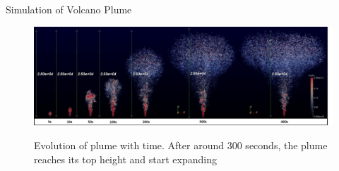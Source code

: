 \documentclass[final]{beamer}
\newlength{\onecolwid}
\newlength{\twocolwid}
\begin{document}
\begin{frame}[t]
\begin{columns}[t]
\begin{column}{\twocolwid}
\begin{columns}[t,totalwidth=\twocolwid]
\begin{column}{\onecolwid}




\end{column} %

\end{columns} \vspace{-1.0in}

\begin{block}{Simulation of Volcano Plume}

\begin{figure}
\centering
{\includegraphics[scale=0.90]{plume_grow_up}}
\caption{Evolution of plume with time. After around 300 seconds, the plume reaches its top height and start expanding}
\end{figure}

\end{block}\vspace{-1.8in}

\begin{columns}[t,totalwidth=\twocolwid] \vspace{-1.5in}%

\begin{column}{\onecolwid} %


\end{column}
\end{columns}
\end{column}
\end{columns}
\end{frame}
\end{document}
